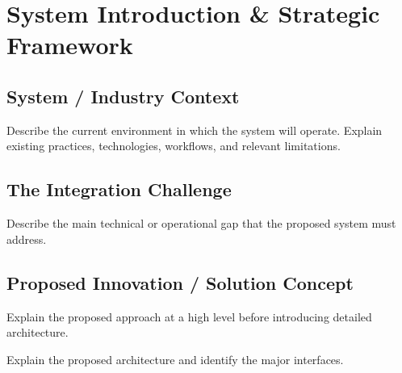 
\section{System Introduction \& Strategic Framework}

\subsection{System / Industry Context}

Describe the current environment in which the system will operate.
Explain existing practices, technologies, workflows, and relevant limitations.

\subsection{The Integration Challenge}

Describe the main technical or operational gap that the proposed system must address.

\subsection{Proposed Innovation / Solution Concept}

Explain the proposed approach at a high level before introducing detailed architecture.

Explain the proposed architecture and identify the major interfaces.
